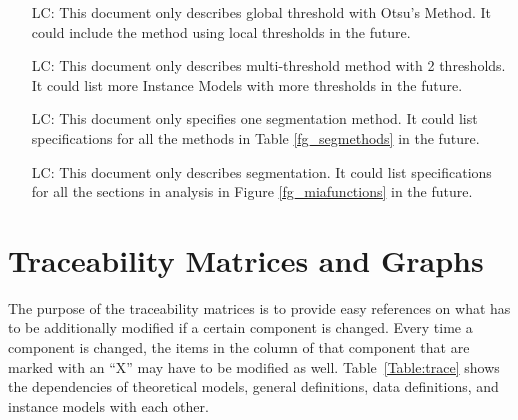 \documentclass[12pt]{article}
\newcounter{lcnum} %
\begin{document}
\noindent \begin{itemize}

\item[LC\refstepcounter{lcnum}\thelcnum\label{LC_localthres}:]This document only describes global threshold with Otsu's Method. It could include the method using local thresholds in the future.

\item[LC\refstepcounter{lcnum}\thelcnum\label{LC_morek}:]This document only describes multi-threshold method with 2 thresholds. It could list more Instance Models with more thresholds in the future.

\item[LC\refstepcounter{lcnum}\thelcnum\label{LC_allmethods}:]This document only specifies one segmentation method. It could list specifications for all the methods in Table \ref{fg_segmethods} in the future.

\item[LC\refstepcounter{lcnum}\thelcnum\label{LC_allanalysis}:]This document only describes segmentation. It could list specifications for all the sections in analysis in Figure \ref{fg_miafunctions} in the future.

\end{itemize}

\section{Traceability Matrices and Graphs}

The purpose of the traceability matrices is to provide easy references on what has to be additionally modified if a certain component is changed.  Every time a component is changed, the items in the column of that component that are marked with an ``X'' may have to be modified as well.  Table~\ref{Table:trace} shows the
dependencies of theoretical models, general definitions, data definitions, and instance models with each other.
\end{document}
